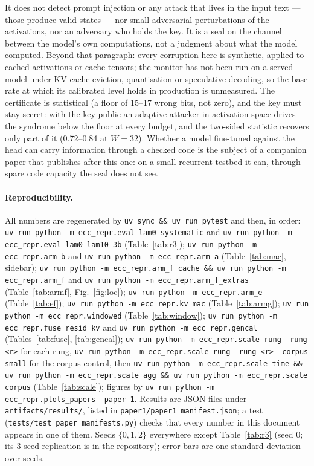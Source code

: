 \documentclass[10pt,twocolumn]{article}
\begin{document}
It does not detect prompt injection or any attack that lives in the input
text --- those produce valid states --- nor small adversarial perturbations of the
activations, nor an adversary who holds the key. It is a seal on the channel between
the model's own computations, not a judgment about what the model computed. Beyond
that paragraph: every corruption here is synthetic, applied to cached activations or
cache tensors; the monitor has not been run on a served model under KV-cache eviction,
quantisation or speculative decoding, so the base rate at which its calibrated level
holds in production is unmeasured. The certificate is statistical (a floor of 15--17
wrong bits, not zero), and the key must stay secret: with the key public an adaptive
attacker in activation space drives the syndrome below the floor at every budget, and
the two-sided statistic recovers only part of it (0.72--0.84 at $W{=}32$). Whether a
model fine-tuned against the head can carry information through a checked code is the
subject of a companion paper that publishes after this one: on a small recurrent testbed it can,
through spare code capacity the seal does not see.

\paragraph{Reproducibility.} All numbers are regenerated by \texttt{uv sync \&\& uv run
pytest} and then, in order: \texttt{uv run python -m ecc\_repr.eval lam0 systematic}
and \texttt{uv run python -m ecc\_repr.eval lam0 lam10 3b} (Table~\ref{tab:r3});
\texttt{uv run python -m ecc\_repr.arm\_b} and \texttt{uv run python -m ecc\_repr.arm\_a}
(Table~\ref{tab:mac}, sidebar); \texttt{uv run python -m ecc\_repr.arm\_f cache \&\& uv run
python -m ecc\_repr.arm\_f} and \texttt{uv run python -m ecc\_repr.arm\_f\_extras}
(Table~\ref{tab:armf}, Fig.~\ref{fig:loc}); \texttt{uv run python -m ecc\_repr.arm\_e}
(Table~\ref{tab:ef}); \texttt{uv run python -m ecc\_repr.kv\_mac} (Table~\ref{tab:armg});
\texttt{uv run python -m ecc\_repr.windowed} (Table~\ref{tab:window}); \texttt{uv run
python -m ecc\_repr.fuse resid kv} and \texttt{uv run python -m ecc\_repr.gencal}
(Tables~\ref{tab:fuse}, \ref{tab:gencal}); \texttt{uv run python -m ecc\_repr.scale rung
--rung <r>} for each rung, \texttt{uv run python -m ecc\_repr.scale rung --rung <r>
--corpus small} for the corpus control, then \texttt{uv run python -m ecc\_repr.scale
time \&\& uv run python -m ecc\_repr.scale agg \&\& uv run python -m ecc\_repr.scale
corpus} (Table~\ref{tab:scale}); figures by \texttt{uv run python -m
ecc\_repr.plots\_papers --paper 1}. Results are JSON files under
\texttt{artifacts/results/}, listed in \texttt{paper1/paper1\_manifest.json}; a test
(\texttt{tests/test\_paper\_manifests.py}) checks that every number in this document
appears in one of them. Seeds $\{0,1,2\}$ everywhere except Table~\ref{tab:r3} (seed 0;
its 3-seed replication is in the repository); error bars are one standard deviation
over seeds.
\end{document}

